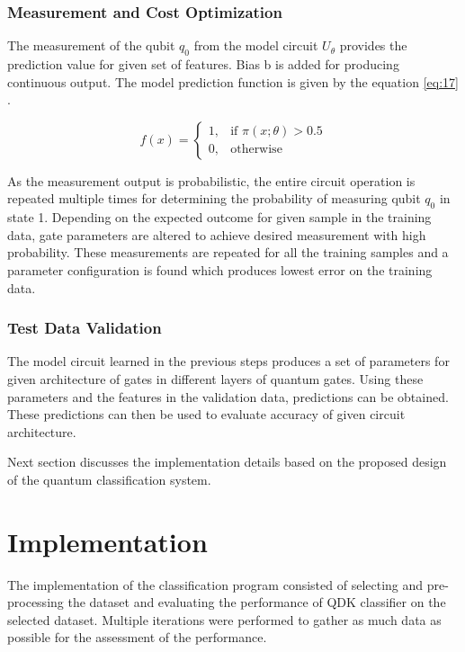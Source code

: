 \documentclass[english,a4paper,11pt,oneside,onecolumn]{book}
\begin{document}
\subsection{Measurement and Cost Optimization}
The measurement of the qubit $q_0$ from the model circuit $U_\theta$ provides the prediction value for given set of features. Bias b is added for producing continuous output. The model prediction function is given by the equation \ref{eq:17} \cite{schuld_2020_circuitcentric}.

\begin{equation}\label{eq:17}
    f(x)= 
\begin{cases}
    1,& \text{if } \pi(x; \theta) > 0.5\\
    0,              & \text{otherwise}
\end{cases}
\end{equation}

As the measurement output is probabilistic, the entire circuit operation is repeated multiple times for determining the probability of measuring qubit $q_0$ in state 1. Depending on the expected outcome for given sample in the training data, gate parameters are altered to achieve desired measurement with high probability. These measurements are repeated for all the training samples and a parameter configuration is found which produces lowest error on the training data.

\subsection{Test Data Validation}
The model circuit learned in the previous steps produces a set of parameters for given architecture of gates in different layers of quantum gates. Using these parameters and the features in the validation data, predictions can be obtained. These predictions can then be used to evaluate accuracy of given circuit architecture.

Next section discusses the implementation details based on the proposed design of the quantum classification system.

\chapter{Implementation}
\label{sec:impl}
The implementation of the classification program consisted of selecting and pre-processing the dataset and evaluating the performance of QDK classifier on the selected dataset. Multiple iterations were performed to gather as much data as possible for the assessment of the performance.  
\end{document}
